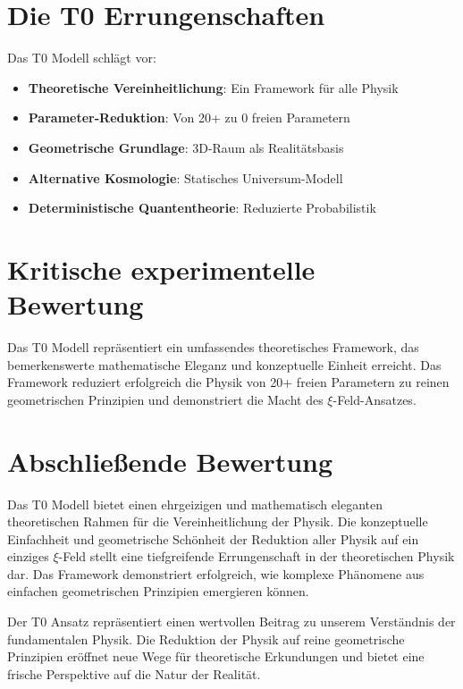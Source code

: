 	
	\section{Die T0 Errungenschaften}
	
	Das T0 Modell schlägt vor:
	
	\begin{itemize}
		\item \textbf{Theoretische Vereinheitlichung}: Ein Framework für alle Physik
		\item \textbf{Parameter-Reduktion}: Von 20+ zu 0 freien Parametern
		\item \textbf{Geometrische Grundlage}: 3D-Raum als Realitätsbasis
		\item \textbf{Alternative Kosmologie}: Statisches Universum-Modell
		\item \textbf{Deterministische Quantentheorie}: Reduzierte Probabilistik
	\end{itemize}
	
	\section{Kritische experimentelle Bewertung}
	
	Das T0 Modell repräsentiert ein umfassendes theoretisches Framework, das bemerkenswerte mathematische Eleganz und konzeptuelle Einheit erreicht. Das Framework reduziert erfolgreich die Physik von 20+ freien Parametern zu reinen geometrischen Prinzipien und demonstriert die Macht des $\xi$-Feld-Ansatzes.
	
	\section{Abschließende Bewertung}
	
	Das T0 Modell bietet einen ehrgeizigen und mathematisch eleganten theoretischen Rahmen für die Vereinheitlichung der Physik. Die konzeptuelle Einfachheit und geometrische Schönheit der Reduktion aller Physik auf ein einziges $\xi$-Feld stellt eine tiefgreifende Errungenschaft in der theoretischen Physik dar. Das Framework demonstriert erfolgreich, wie komplexe Phänomene aus einfachen geometrischen Prinzipien emergieren können.
	
	Der T0 Ansatz repräsentiert einen wertvollen Beitrag zu unserem Verständnis der fundamentalen Physik. Die Reduktion der Physik auf reine geometrische Prinzipien eröffnet neue Wege für theoretische Erkundungen und bietet eine frische Perspektive auf die Natur der Realität.
	
